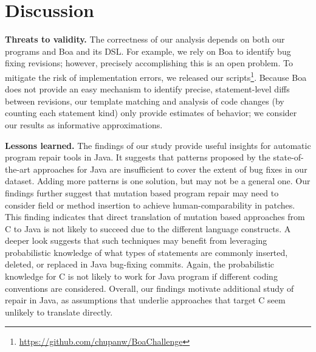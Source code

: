 \documentclass{sig-alternate-05-2015}
\begin{document}
\section{Discussion}

\noindent\textbf{Threats to validity.} The correctness of our analysis
depends on both our programs and Boa and its DSL. For example, we rely on Boa to
identify bug fixing revisions; however, precisely accomplishing this is an open
problem.  To mitigate the risk of implementation errors,
we released our scripts\footnote{\url{https://github.com/chupanw/BoaChallenge}}.
Because Boa does not provide an easy mechanism
to identify precise, statement-level diffs between revisions, our template
matching and analysis of code changes (by counting each statement kind) only
provide estimates of behavior; we consider our results as informative
approximations. 

\noindent\textbf{Lessons learned.} The findings of our study provide useful
insights for automatic program repair tools in Java. It suggests that patterns
proposed by the state-of-the-art approaches for Java are insufficient to cover
the extent of bug fixes in our dataset.  Adding more patterns is one solution,
but may not be a general one.  Our findings further suggest that mutation based
program repair may need to consider field or method insertion to achieve
human-comparability in patches. This finding indicates that direct translation
of mutation based approaches from C to Java is not likely to succeed due to the
different language constructs.  A deeper look suggests that such techniques may
benefit from leveraging probabilistic knowledge of what types of statements are
commonly inserted, deleted, or replaced in Java bug-fixing commits. Again, the
probabilistic knowledge for C is not likely to work for Java program if
different coding conventions are considered.  Overall, our findings motivate
additional study of repair in Java, as assumptions that underlie approaches that
target C seem unlikely to translate directly.


\end{document}
